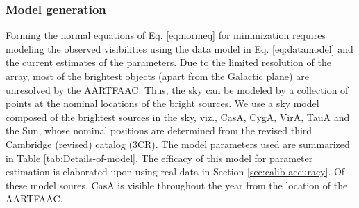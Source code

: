 \documentclass{aa}
\begin{document}
\subsubsection{\label{sub:Model-generation}Model generation}
\begin{table}[tbh]
\caption{Details of model sources (the A-team) used for All-sky self-calibration}
\label{tab:Details-of-model}
\end{table}

Forming the  normal equations of  Eq. \ref{eq:normeq} for  minimization requires
modeling    the    observed   visibilities    using    the    data   model    in
Eq. \ref{eq:datamodel} and the current  estimates of the parameters.  Due to the
limited resolution of  the array, most of the brightest  objects (apart from the
Galactic plane) are unresolved by the AARTFAAC.  Thus, the sky can be modeled by
a collection of points at the nominal  locations of the bright sources. We use a
sky model composed of the brightest  sources in the sky, viz., CasA, CygA, VirA,
TauA and the Sun, whose nominal  positions are determined from the revised third
Cambridge (revised) catalog (3CR).  The  model parameters used are summarized in
Table  \ref{tab:Details-of-model}.  The efficacy  of  this  model for  parameter
estimation    is    elaborated    upon    using    real    data    in    Section
\ref{sec:calib-accuracy}.  Of these model soures, CasA is visible throughout the
year from the location of the AARTFAAC.
\end{document}
